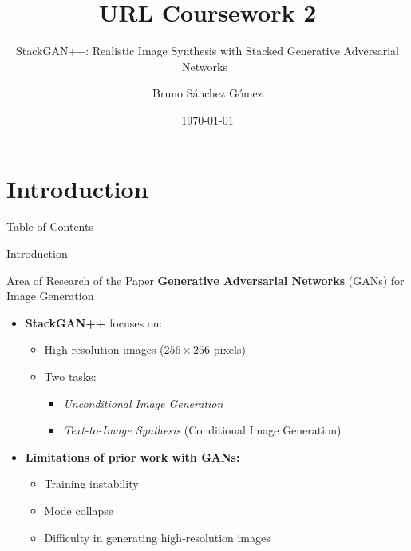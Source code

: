 \documentclass{beamer}
\title{URL Coursework 2}
\subtitle{StackGAN++: Realistic Image Synthesis with Stacked Generative Adversarial Networks~\cite{stackgan++}}
\author{Bruno Sánchez Gómez}
\date{\today}
\begin{document}
\begin{frame}
    \titlepage
\end{frame}

\section{Introduction}
\begin{frame}{Table of Contents}
    \tableofcontents
\end{frame}

\begin{frame}{Introduction}
    \centering
    \begin{minipage}{0.9\textwidth}
        \begin{block}{Area of Research of the Paper}
            \textbf{Generative Adversarial Networks} (GANs) for Image Generation
        \end{block}
    \end{minipage}
    \vspace{1em}
    \begin{itemize}
        \item \textbf{StackGAN++} focuses on:
        \begin{itemize}
            \item High-resolution images ($256 \times 256$ pixels)
            \item Two tasks:
            \begin{itemize}
                \item \textit{Unconditional Image Generation}
                \item \textit{Text-to-Image Synthesis} (Conditional Image Generation)
            \end{itemize}
        \end{itemize}
    \end{itemize}
    \pause
    \begin{itemize}
        \item \textbf{Limitations of prior work with GANs:}
        \begin{itemize}
            \item Training instability
            \item Mode collapse
            \item Difficulty in generating high-resolution images
        \end{itemize}
    \end{itemize}
\end{frame}
\end{document}

